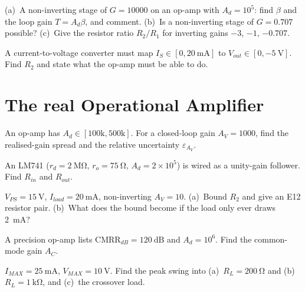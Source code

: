 \documentclass[11pt,a4paper,oneside]{book}
\newcommand{\op}{op-amp}
\newcommand{\Ad}{A_d}
\begin{document}
\begin{exercise}
(a)~A non-inverting stage of $G=10000$ on an \op{} with $\Ad=10^5$: find $\beta$
and the loop gain $T=\Ad\beta$, and comment.
(b)~Is a non-inverting stage of $G=0.707$ possible?
(c)~Give the resistor ratio $R_2/R_1$ for inverting gains $-3$, $-1$, $-0.707$.
\end{exercise}

\begin{exercise}
A current-to-voltage converter must map $I_S\in[0,\qty{20}{\milli\ampere}]$ to
$V_{out}\in[0,\qty{-5}{\volt}]$. Find $R_2$ and state what the \op{} must be able
to do.
\end{exercise}

\chapter{The real Operational Amplifier}

\begin{exercise}
An \op{} has $\Ad\in[100\text{k},500\text{k}]$. For a closed-loop gain
$A_V=1000$, find the realised-gain spread and the relative uncertainty
$\varepsilon_{A_V}$.
\end{exercise}

\begin{exercise}
An LM741 ($r_d=\qty{2}{\mega\ohm}$, $r_o=\qty{75}{\ohm}$, $\Ad=2\times10^5$) is
wired as a unity-gain follower. Find $R_{in}$ and $R_{out}$.
\end{exercise}

\begin{exercise}
$V_{PS}=\qty{15}{\volt}$, $I_{load}=\qty{20}{\milli\ampere}$, non-inverting
$A_V=10$. (a)~Bound $R_2$ and give an E12 resistor pair.
(b)~What does the bound become if the load only ever draws \qty{2}{\milli\ampere}?
\end{exercise}

\begin{exercise}
A precision \op{} lists $\text{CMRR}_{dB}=\qty{120}{\dB}$ and $\Ad=10^6$. Find the
common-mode gain $A_C$.
\end{exercise}

\begin{exercise}
$I_{MAX}=\qty{25}{\milli\ampere}$, $V_{MAX}=\qty{10}{\volt}$. Find the peak swing
into (a)~$R_L=\qty{200}{\ohm}$ and (b)~$R_L=\qty{1}{\kilo\ohm}$, and (c)~the
crossover load.
\end{exercise}
\end{document}
